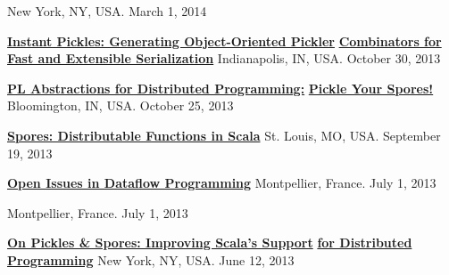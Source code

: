 \documentclass[9pt]{article}
\begin{document}
 \vspace{-0.03in}
\linebreak{}\dates{}
\linebreak\noindent New York, NY, USA. March 1, 2014
\bigskip

\noindent\href{https://speakerdeck.com/heathermiller/instant-pickles-generating-object-oriented-pickler-combinators-for-fast-and-extensible-serialization}{\bf Instant Pickles: Generating Object-Oriented Pickler} \vspace{-0.03in}
\linebreak\noindent\href{https://speakerdeck.com/heathermiller/instant-pickles-generating-object-oriented-pickler-combinators-for-fast-and-extensible-serialization}{\bf Combinators for Fast and Extensible Serialization}\dates{}
\linebreak\noindent Indianapolis, IN, USA. October 30, 2013
\bigskip

\noindent\href{http://heather.miller.am/files/IU-PL-Abstractions-for-Dist-Programming.pdf}{\bf PL Abstractions for Distributed Programming:} \vspace{-0.03in}
\linebreak\noindent\href{http://heather.miller.am/files/IU-PL-Abstractions-for-Dist-Programming.pdf}{\bf Pickle Your Spores!}\dates{}
\linebreak\noindent Bloomington, IN, USA. October 25, 2013
\bigskip

\noindent\href{https://speakerdeck.com/heathermiller/spores-distributable-functions-in-scala}{\bf Spores: Distributable Functions in Scala} 
\linebreak\noindent St. Louis, MO, USA. September 19, 2013
\bigskip

\noindent\href{http://heather.miller.am/files/LaME2013-Dataflow.pdf}{\bf Open Issues in Dataflow Programming} 
\linebreak\noindent Montpellier, France. July 1, 2013
\bigskip

 
\linebreak\noindent Montpellier, France. July 1, 2013
\bigskip

\noindent\href{https://speakerdeck.com/heathermiller/on-pickles-and-spores-improving-support-for-distributed-programming-in-scala}{\bf On Pickles \& Spores: Improving Scala's Support} \vspace{-0.03in}
\linebreak\noindent\href{https://speakerdeck.com/heathermiller/on-pickles-and-spores-improving-support-for-distributed-programming-in-scala}{\bf for Distributed Programming}\dates{}
\linebreak\noindent New York, NY, USA. June 12, 2013
\bigskip
\end{document}
